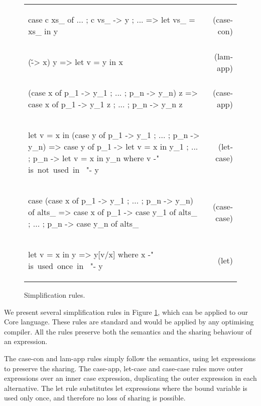 \begin{figure}
\renewcommand{\f}[2]{\vspace{-7mm} #2 & (#1) \\}

\begin{flushright}
\begin{tabular}{p{8cm}r}
\f{case-con}{
\begin{code}
case c xs_ of {... ; c vs_ -> y ; ...}
    => let vs_ = xs_ in y
\end{code}}

\f{lam-app}{
\begin{code}
(\v -> x) y
    => let v = y in x
\end{code}}

\f{case-app}{
\begin{code}
(case x of {p_1 -> y_1 ; ... ; p_n -> y_n}) z
    => case x of {p_1 -> y_1 z ; ... ; p_n -> y_n z}
\end{code}}

\f{let-case}{
\begin{code}
let v = x in (case y of {p_1 -> y_1 ; ... ; p_n -> y_n})
    => case y of  {  p_1  -> let v = x in y_1
                  ;  ...
                  ;  p_n  -> let v = x in y_n}
    where v {-" \hbox{is not used in } "-} y
\end{code}}

\f{case-case}{
\begin{code}
case (case x of {p_1 -> y_1 ; ... ; p_n -> y_n}) of alts_
    => case x of  {  p_1  -> case y_1 of alts_
                  ;  ...
                  ;  p_n  -> case y_n of alts_ }
\end{code}}

\f{let}{
\begin{code}
let v = x in y
    => y[v/x]
    where x {-" \hbox{is used once in } "-} y
\end{code}}
\end{tabular}
\end{flushright}
\caption{Simplification rules.}
\label{fig:simplify}
\end{figure}

We present several simplification rules in Figure \ref{fig:simplify}, which can be applied to our Core language. These rules are standard and would be applied by any optimising compiler. All the rules preserve both the semantics and the sharing behaviour of an expression.

The case-con and lam-app rules simply follow the semantics, using let expressions to preserve the sharing. The case-app, let-case and case-case rules move outer expressions over an inner case expression, duplicating the outer expression in each alternative. The let rule substitutes let expressions where the bound variable is used only once, and therefore no loss of sharing is possible.


